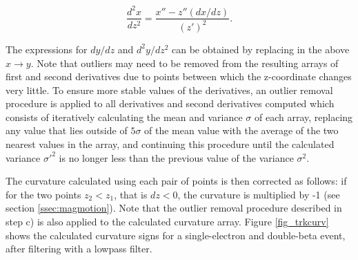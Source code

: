 \documentclass{JINST}
\begin{document}
\begin{equation}
\frac{d^2x}{dz^2} = \frac{x'' - z''(dx/dz)}{(z')^2}.
\end{equation}

The expressions for $dy/dz$ and $d^2y/dz^2$ can be obtained by replacing in the above $x \rightarrow y$.  Note that outliers may need to be removed from the resulting arrays of first and second derivatives due to points between which the z-coordinate changes very little.  To ensure more stable values of the derivatives, an outlier removal procedure is applied to all derivatives and second derivatives computed which consists of iteratively calculating the mean and variance $\sigma$ of each array, replacing any value that lies outside of $5\sigma$ of the mean value with the average of the two nearest values in the array, and continuing this procedure until the calculated variance $\sigma'^2$ is no longer less than the previous value of the variance $\sigma^2$. %

The curvature calculated using each pair of points is then corrected as follows: if for the two points $z_2 < z_1$, that is $dz < 0$, the curvature is multiplied by -1 (see section \ref{ssec:magmotion}).  Note that the outlier removal procedure described in step c) is also applied to the calculated curvature array.  Figure \ref{fig_trkcurv} shows the calculated curvature signs for a single-electron and double-beta event, after filtering with a lowpass filter.
\end{document}
